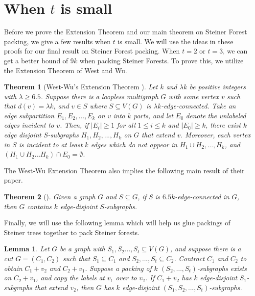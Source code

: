 \documentclass{article}
\newtheorem{lemma}{Lemma}[section]
\newtheorem{theorem}{Theorem}[section]
\begin{document}
\section{When $t$ is small}

Before we prove the Extension Theorem and our main theorem on Steiner Forest packing, we give a few results when $t$ is small. We will use the ideas in these proofs for our final result on Steiner Forest packing. When $t = 2$ or $t=3$, we can get a better bound of $9k$ when packing Steiner Forests. To prove this, we utilize the Extension Theorem of West and Wu. 

\begin{theorem}[West-Wu's Extension Theorem \cite{westwu}]\label{thm:wwextthem}
    Let $k$ and $\lambda k$ be positive integers with $\lambda \geq 6.5$. Suppose there is a loopless multigraph $G$ with some vertex $v$ such that $d(v) = \lambda k$, and $v \in S$ where $S \subseteq V(G)$ is $\lambda k$-edge-connected. Take an edge subpartition $E_1,E_2,...,E_k$ on $v$ into $k$ parts, and let $E_0$ denote the unlabeled edges incident to $v$. Then, if $|E_i| \geq 1$ for all $1 \leq i \leq k$ and $|E_0| \geq k$, there exist $k$ edge disjoint $S$-subgraphs $H_1,H_2,...,H_k$ on $G$ that extend $v$. Moreover, each vertex in $S$ is incident to at least $k$ edges which do not appear in $H_1 \cup H_2,...,H_k$, and $(H_1 \cup H_2... H_k) \cap E_0 = \emptyset$. 
\end{theorem}

The West-Wu Extension Theorem also implies the following main result of their paper.

\begin{theorem}[\cite{westwu}]\label{thm:wwpacking}
     Given a graph $G$ and $S \subseteq G$, if S is $6.5k$-edge-connected in $G$, then $G$ contains $k$ edge-disjoint $S$-subgraphs.
\end{theorem}

Finally, we will use the following lemma which will help us glue packings of Steiner trees together to pack Steiner forests. 

\begin{lemma}\label{lem:forestglue}
    Let $G$ be a graph with $S_1,S_2...,S_t \subseteq V(G)$, and suppose there is a cut $G=(C_1,C_2)$ such that $S_1 \subseteq C_1$ and $S_2,...,S_t \subseteq C_2$. Contract $C_1$ and $C_2$ to obtain $C_1+v_2$ and $C_2+v_1$. Suppose a packing of $k$ $(S_2,...,S_t)$-subgraphs exists on $C_2+v_1$, and copy the labels at $v_1$ over to $v_2$. If $C_1+v_2$ has $k$ edge-disjoint $S_1$-subgraphs that extend $v_2$, then $G$ has $k$ edge-disjoint $(S_1,S_2,...,S_t)$-subgraphs. 
\end{lemma}
\end{document}
